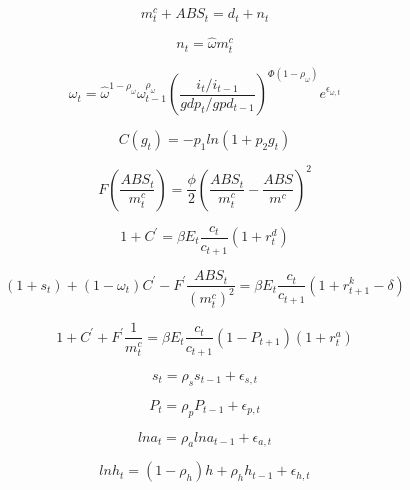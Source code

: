 \documentclass[cn,10pt,math=newtx,citestyle=gb7714-2015,bibstyle=gb7714-2015]{elegantbook}
\begin{document}
	\begin{equation}\label{label}
		m_t^c+ABS_t=d_t+n_t
	\end{equation}
	
	\begin{equation}\label{label}
		n_t=\hat{\omega}m_t^c
	\end{equation}
	
	\begin{equation}\label{label}
		\omega_t=\hat{\omega}^{1-\rho_{\omega}}\omega_{t-1}^{\rho_{\omega}}\left(\frac{i_t/i_{t-1}}{gdp_t/gpd_{t-1}}\right)^{\Phi(1-\rho_{\omega})}e^{\epsilon_{\omega,t}}
	\end{equation}
	
	\begin{equation}\label{label}
		C(g_t)=-p_1ln(1+p_2g_t)
	\end{equation}
	
	\begin{equation}\label{label}
		F(\frac{ABS_t}{m_t^c})=\frac{\phi}{2}\left(\frac{ABS_t}{m_t^c}-\frac{ABS}{m^c}\right)^2
	\end{equation}
	
	\begin{equation}\label{label}
		1+C^{'}=\beta E_t\frac{c_t}{c_{t+1}}(1+r_t^d)
	\end{equation}
	
	\begin{equation}\label{label}
		(1+s_t)+(1-\omega_t)C^{'}-F^{'}\frac{ABS_t}{(m_t^c)^2}=\beta E_t\frac{c_t}{c_{t+1}}(1+r_{t+1}^k-\delta)
	\end{equation}
	
	\begin{equation}\label{label}
		1+C^{'}+F^{'}\frac{1}{m_t^c}=\beta E_t\frac{c_t}{c_{t+1}}(1-P_{t+1})(1+r_t^a)
	\end{equation}
	
	\begin{equation}\label{label}
		s_t=\rho_ss_{t-1}+\epsilon_{s,t}
	\end{equation}
	
	\begin{equation}\label{label}
		P_t=\rho_pP_{t-1}+\epsilon_{p,t}
	\end{equation}
	
	\begin{equation}\label{label}
		lna_t=\rho_alna_{t-1}+\epsilon_{a,t}
	\end{equation}
	
	\begin{equation}\label{label}
		lnh_t=(1-\rho_h)h+\rho_hh_{t-1}+\epsilon_{h,t}
	\end{equation}
	
\end{document}
